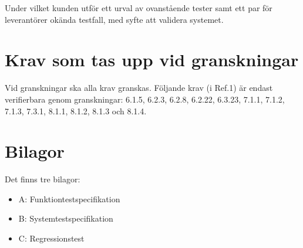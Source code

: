\documentclass[a4paper]{article}
\begin{document}
Under vilket kunden utför ett urval av ovanstående tester samt ett par för leverantörer okända testfall, med syfte att validera systemet.

\section{Krav som tas upp vid granskningar}


Vid granskningar ska alla krav granskas.
Följande krav (i Ref.1) är endast verifierbara genom granskningar: 6.1.5, 6.2.3, 6.2.8, 6.2.22, 6.3.23, 7.1.1, 7.1.2, 7.1.3, 7.3.1, 8.1.1, 8.1.2, 8.1.3 och 8.1.4.

\section{Bilagor}

Det finns tre bilagor:

\begin{itemize}
\item A: Funktiontestspecifikation
\item B: Systemtestspecifikation
\item C: Regressionstest

\end{itemize}

\newpage
\end{document}

